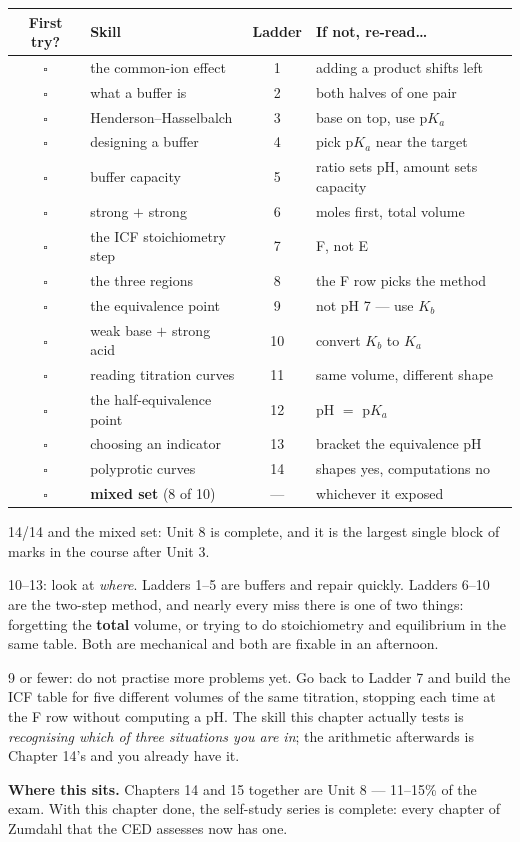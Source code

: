 \documentclass{apchem-worksheet}
\begin{document}
\renewcommand{\arraystretch}{1.25}
\noindent\begin{tabular}{@{}c p{5.7cm} c p{4.9cm}@{}}
\toprule
\textbf{First try?} & \textbf{Skill} & \textbf{Ladder} &
  \textbf{If not, re-read\ldots}\\
\midrule
$\square$ & the common-ion effect & 1 & adding a product shifts left \\
$\square$ & what a buffer is & 2 & both halves of one pair \\
$\square$ & Henderson--Hasselbalch & 3 & base on top, use p$K_{a}$ \\
$\square$ & designing a buffer & 4 & pick p$K_{a}$ near the target \\
$\square$ & buffer capacity & 5 & ratio sets pH, amount sets capacity \\
$\square$ & strong $+$ strong & 6 & moles first, total volume \\
$\square$ & the ICF stoichiometry step & 7 & F, not E \\
$\square$ & the three regions & 8 & the F row picks the method \\
$\square$ & the equivalence point & 9 & not pH 7 --- use $K_{b}$ \\
$\square$ & weak base $+$ strong acid & 10 & convert $K_{b}$ to $K_{a}$ \\
$\square$ & reading titration curves & 11 & same volume, different shape \\
$\square$ & the half-equivalence point & 12 & pH $=$ p$K_{a}$ \\
$\square$ & choosing an indicator & 13 & bracket the equivalence pH \\
$\square$ & polyprotic curves & 14 & shapes yes, computations no \\
\midrule
$\square$ & \textbf{mixed set} (8 of 10) & --- & whichever it exposed \\
\bottomrule
\end{tabular}

\begin{apcnote}
14/14 and the mixed set: Unit 8 is complete, and it is the largest
single block of marks in the course after Unit 3.

10--13: look at \emph{where}. Ladders 1--5 are buffers and repair
quickly. Ladders 6--10 are the two-step method, and nearly every miss
there is one of two things: forgetting the \textbf{total} volume, or
trying to do stoichiometry and equilibrium in the same table. Both are
mechanical and both are fixable in an afternoon.

9 or fewer: do not practise more problems yet. Go back to Ladder 7 and
build the ICF table for five different volumes of the same titration,
stopping each time at the F row without computing a pH. The skill this
chapter actually tests is \emph{recognising which of three situations
you are in}; the arithmetic afterwards is Chapter 14's and you already
have it.

\textbf{Where this sits.} Chapters 14 and 15 together are Unit 8 ---
11--15\% of the exam. With this chapter done, the self-study series is
complete: every chapter of Zumdahl that the CED assesses now has one.
\end{apcnote}
\end{document}
